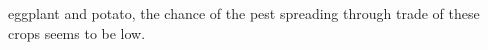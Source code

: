 \documentclass[11pt]{article}
\newcommand{\aacomment}[1]{({\color{magenta}AA: #1})}
\theoremstyle{definition}
\begin{document}
eggplant and potato, the chance of the pest spreading through trade of
these crops seems to be low.
\end{document}
